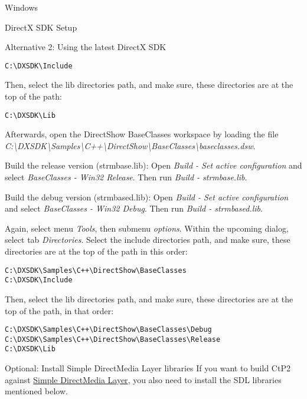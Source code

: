 \begin{section}{Windows}
\begin{subsection}{DirectX SDK Setup}
\begin{subsubsection}{Alternative 2: Using the latest DirectX SDK}
\begin{verbatim}
C:\DXSDK\Include
\end{verbatim}

Then, select the lib directories path, and make sure, these directories are at the top of the path:

\begin{verbatim}
C:\DXSDK\Lib
\end{verbatim}

Afterwards, open the DirectShow BaseClasses workspace by loading the file\\ \textit{C:\textbackslash{}DXSDK\textbackslash{}Samples\textbackslash{}C++\textbackslash{}DirectShow\textbackslash{}BaseClasses\textbackslash{}baseclasses.dsw}.

Build the release version (strmbase.lib):
Open \textit{Build - Set active configuration} and select \textit{BaseClasses - Win32 Release}. Then run \textit{Build - strmbase.lib}.

Build the debug version (strmbased.lib):
Open \textit{Build - Set active configuration} and select \textit{BaseClasses - Win32 Debug}. Then run \textit{Build - strmbased.lib}.

Again, select menu \textit{Tools}, then submenu \textit{options}. Within the upcoming dialog, select tab \textit{Directories}. Select the include directories path, and make sure, these directories are at the top of the path in this order:

\begin{verbatim}
C:\DXSDK\Samples\C++\DirectShow\BaseClasses
C:\DXSDK\Include
\end{verbatim}

Then, select the lib directories path, and make sure, these directories are at the top of the path, in that order:

\begin{verbatim}
C:\DXSDK\Samples\C++\DirectShow\BaseClasses\Debug
C:\DXSDK\Samples\C++\DirectShow\BaseClasses\Release
C:\DXSDK\Lib
\end{verbatim}
\end{subsubsection}%
\end{subsection}%

\begin{subsection}{Optional: Install Simple DirectMedia Layer libraries}
If you want to build CtP2 against \href{http://www.libsdl.org}{Simple DirectMedia Layer}, you also need to install the SDL libraries mentioned below.


\end{subsection}
\end{section}
